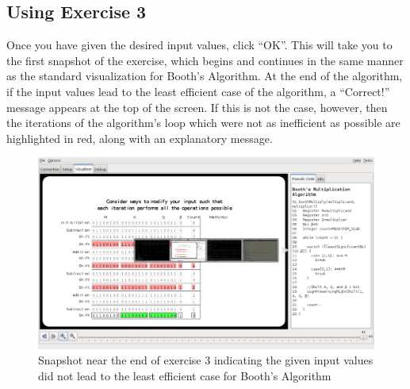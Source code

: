 \documentclass{article}
\begin{document}
\pagebreak

\subsection{Using Exercise 3}
Once you have given the desired input values, click ``OK''.
This will take you to the first snapshot of the exercise, which begins and continues in the same manner as the standard visualization for Booth's Algorithm.
At the end of the algorithm, if the input values lead to the least efficient case of the algorithm, a ``Correct!'' message appears at the top of the screen.
If this is not the case, however, then the iterations of the algorithm's loop which were not as inefficient as possible are highlighted in red, along with an explanatory message.

\begin{figure}[h]
\centering
\includegraphics[scale=0.4]{ex3finish.pdf}
\caption{Snapshot near the end of exercise 3 indicating the given input values did not lead to the least efficient case for Booth's Algorithm}
\end{figure}
\end{document}
